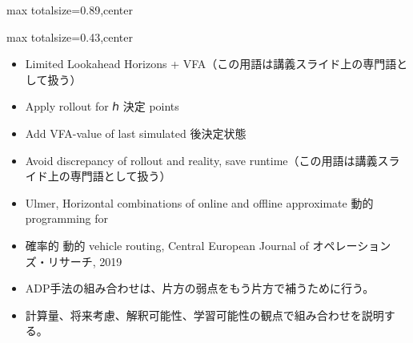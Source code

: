 \begin{minipage}[t]{0.58\textwidth}
\begin{adjustbox}{max totalsize={\textwidth}{0.89\textheight},center}
\begin{minipage}{\textwidth}
\end{minipage}
\end{adjustbox}
\end{minipage}


\clearpage
{}
\begin{minipage}[t]{0.405\textwidth}
\begin{adjustbox}{max totalsize={\textwidth}{0.43\textheight},center}
\begin{minipage}{\textwidth}\scriptsize
{}\begin{itemize}
\item Limited Lookahead Horizons + VFA（この用語は講義スライド上の専門語として扱う）
\item Apply rollout for ℎ 決定 points
\item Add VFA-value of last simulated 後決定状態
\item Avoid discrepancy of rollout and reality, save runtime（この用語は講義スライド上の専門語として扱う）
\item Ulmer, Horizontal combinations of online and offline approximate 動的 programming for
\item 確率的 動的 vehicle routing, Central European Journal of オペレーションズ・リサーチ, 2019
\end{itemize}\begin{itemize}
\item ADP手法の組み合わせは、片方の弱点をもう片方で補うために行う。
\item 計算量、将来考慮、解釈可能性、学習可能性の観点で組み合わせを説明する。
\end{itemize}
\end{minipage}
\end{adjustbox}
\end{minipage}\hfill

